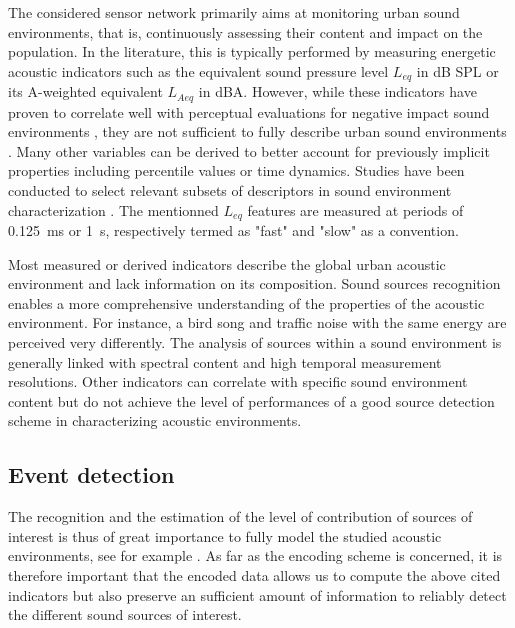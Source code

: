 \documentclass[sensors,article,submit,moreauthors,pdftex,10pt,a4paper]{mdpi}
\begin{document}
The considered sensor network primarily aims at monitoring urban sound environments, that is, continuously assessing their content and impact on the population. In the literature, this is typically performed by measuring energetic acoustic indicators such as the equivalent sound pressure level $L_{eq}$ in dB SPL or its A-weighted equivalent $L_{Aeq}$ in dBA. However, while these indicators have proven to correlate well with perceptual evaluations for negative impact sound environments \cite{gozalo2015}, they are not sufficient to fully describe urban sound environments \cite{rychtarikova2013}. Many other variables can be derived to better account for previously implicit properties \cite{can2016} including percentile values or time dynamics. Studies have been conducted to select relevant subsets of descriptors in sound environment characterization \cite{can2015, brocolini2013, nilsson2007}. The mentionned $L_{eq}$ features are measured at periods of 0.125~ms or 1~s, respectively termed as "fast" and "slow" as a convention.

Most measured or derived indicators describe the global urban acoustic environment and lack information on its composition. Sound sources recognition enables a more comprehensive understanding of the properties of the acoustic environment. For instance, a bird song and traffic noise with the same energy are perceived very differently. The analysis of sources within a sound environment is generally linked with spectral content \cite{ishiyama2000} and high temporal measurement resolutions. Other indicators can correlate with specific sound environment content \cite{aumond2017} but do not achieve the level of performances of a good source detection scheme in characterizing acoustic environments.



\subsection{Event detection}

The recognition and the estimation of the level of contribution of sources of interest is thus of great importance to fully model the studied acoustic environments, see for example \cite{alsina2016design, app7020146, gloaguen2016estimating}. As far as the encoding scheme is concerned, it is therefore important that the encoded data allows us to compute the above cited indicators but also preserve an sufficient amount of information to reliably detect the different sound sources of interest.
\end{document}
